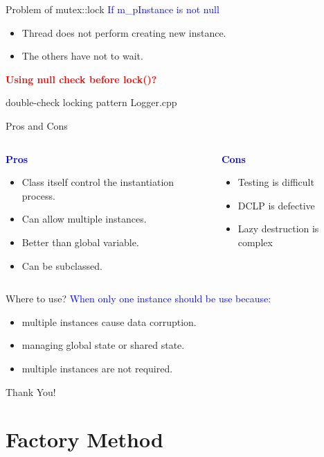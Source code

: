 \documentclass[13pt]{beamer}
\begin{document}
\begin{frame}{Problem of mutex::lock}
	\textcolor{blue}{If m\_pInstance is not null}	
	\begin{itemize}
		\setlength\itemsep{1em}
		\item Thread does not perform creating new instance.
		\item The others have not to wait. 
	\end{itemize}
	\textcolor{red}{\textbf{Using null check before lock()?}}
\end{frame}

\begin{frame}{double-check locking pattern}
Logger.cpp
\lstset{basicstyle=\tiny,style=myCustomCppStyle}

\end{frame}

\begin{frame}{Pros and Cons}
\begin{columns}[T]
\begin{column}{.48\textwidth}
	\begin{center}
	\textcolor{blue}{\textbf{Pros}}
	\end{center}
	\begin{itemize}
		\setlength\itemsep{1em}
		\item Class itself control the instantiation process.
		\item Can allow multiple instances.
		\item Better than global variable.
		\item Can be subclassed.
	\end{itemize}
\end{column}
\begin{column}{.48\textwidth}
	\begin{center}
	\textcolor{blue}{\textbf{Cons}}
	\end{center}
		\begin{itemize}
		\setlength\itemsep{1em}
		\item Testing is difficult
		\item DCLP is defective
		\item Lazy destruction is complex
	\end{itemize}
\end{column}
\end{columns}
\end{frame}

\begin{frame}{Where to use?}
	\textcolor{blue}{When only one instance should be use because:}	
	\begin{itemize}
		\setlength\itemsep{1em}
		\item multiple instances cause data corruption.
		\item managing global state or shared state.
		\item multiple instances are not required.
	\end{itemize}
\end{frame}

\begin{frame}
\begin{center}
{\fontsize{40}{50}\selectfont Thank You!}
\end{center}
\end{frame}

\section{Factory Method}
\end{document}
